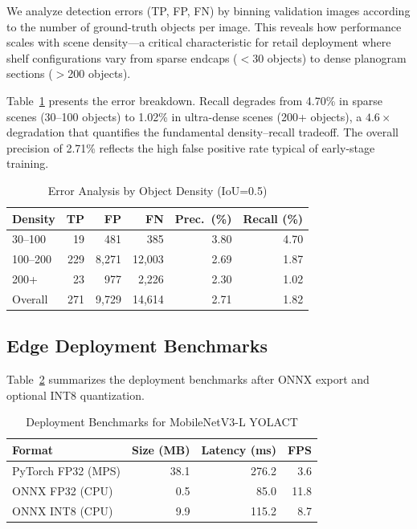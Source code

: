 \documentclass[conference]{IEEEtran}
\begin{document}
We analyze detection errors (TP, FP, FN) by binning validation images
according to the number of ground-truth objects per image. This reveals
how performance scales with scene density---a critical characteristic
for retail deployment where shelf configurations vary from sparse
endcaps ($<$30 objects) to dense planogram sections ($>$200 objects).

Table~\ref{tab:error} presents the error breakdown. Recall degrades
from 4.70\% in sparse scenes (30--100 objects) to 1.02\% in ultra-dense
scenes (200+ objects), a $4.6\times$ degradation that quantifies the
fundamental density--recall tradeoff. The overall precision of 2.71\%
reflects the high false positive rate typical of early-stage training.

\begin{table}[t]
  \centering
  \caption{Error Analysis by Object Density (IoU=0.5)}
  \label{tab:error}
  \begin{tabular}{@{}lrrrrr@{}}
    \toprule
    Density & TP & FP & FN & Prec.\ (\%) & Recall (\%) \\
    \midrule
    30--100   &   19 &   481 &    385 & 3.80 & 4.70 \\
    100--200  &  229 & 8{,}271 & 12{,}003 & 2.69 & 1.87 \\
    200+      &   23 &   977 &  2{,}226 & 2.30 & 1.02 \\
    \midrule
    Overall   &  271 & 9{,}729 & 14{,}614 & 2.71 & 1.82 \\
    \bottomrule
  \end{tabular}
\end{table}

\subsection{Edge Deployment Benchmarks}
\label{sec:edge_results}

Table~\ref{tab:deployment} summarizes the deployment benchmarks after
ONNX export and optional INT8 quantization.

\begin{table}[t]
  \centering
  \caption{Deployment Benchmarks for MobileNetV3-L YOLACT}
  \label{tab:deployment}
  \begin{tabular}{@{}lrrr@{}}
    \toprule
    Format & Size (MB) & Latency (ms) & FPS \\
    \midrule
    PyTorch FP32 (MPS) & 38.1 & 276.2 & 3.6 \\
    ONNX FP32 (CPU)    & 0.5  & 85.0  & 11.8 \\
    ONNX INT8 (CPU)    & 9.9  & 115.2 & 8.7 \\
    \bottomrule
  \end{tabular}
\end{table}
\end{document}
